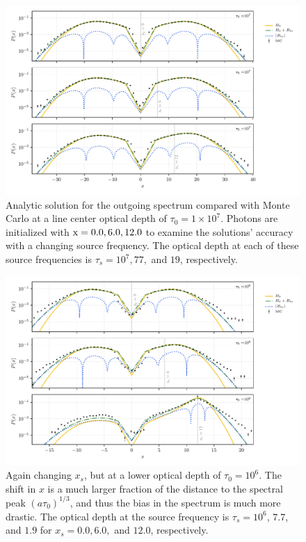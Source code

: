 \documentclass{aastex63}
\begin{document}
 \begin{figure}
    \centering
    \includegraphics{xinit_threepanel.pdf}
    \caption{Analytic solution for the outgoing spectrum compared with Monte Carlo at a line center optical depth of $\tau_0 = 1 \times 10^7$. Photons are initialized with $\rm x = 0.0, 6.0, 12.0$ to examine the solutions' accuracy with a changing source frequency. The optical depth at each of these source frequencies is $\tau_s = 10^7, 77,$ and $19$, respectively.} 
    \label{fig:sol_mc_xinit}
\end{figure}

 \begin{figure}
    \centering
    \includegraphics{xinit_threepanel_tau1e6.pdf}
    \caption{Again changing $x_s$, but at a lower optical depth of $\tau_0 = 10^6$. The shift in $x$ is a much larger fraction of the distance to the spectral peak $(a\tau_0)^{1/3}$, and thus the bias in the spectrum is much more drastic. The optical depth at the source frequency is $\tau_s = 10^6$, $7.7$, and $1.9$ for $x_s=0.0, 6.0,$ and $12.0$, respectively. } 
    \label{fig:sol_mc_xinit_lowtau}
\end{figure}
\end{document}

